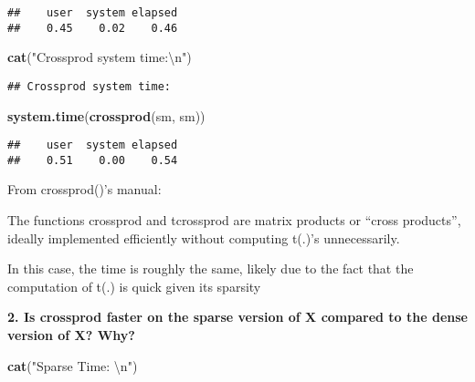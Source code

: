 \documentclass[]{article}
\newenvironment{Shaded}{\begin{snugshade}}{\end{snugshade}}
\newcommand{\CharTok}[1]{\textcolor[rgb]{0.31,0.60,0.02}{#1}}
\newcommand{\KeywordTok}[1]{\textcolor[rgb]{0.13,0.29,0.53}{\textbf{#1}}}
\newcommand{\NormalTok}[1]{#1}
\newcommand{\OperatorTok}[1]{\textcolor[rgb]{0.81,0.36,0.00}{\textbf{#1}}}
\newcommand{\StringTok}[1]{\textcolor[rgb]{0.31,0.60,0.02}{#1}}
\begin{document}
\begin{Shaded}
\end{Shaded}

\begin{verbatim}
##    user  system elapsed 
##    0.45    0.02    0.46
\end{verbatim}

\begin{Shaded}
\begin{Highlighting}[]
\KeywordTok{cat}\NormalTok{(}\StringTok{"Crossprod system time:}\CharTok{\textbackslash{}n}\StringTok{"}\NormalTok{)}
\end{Highlighting}
\end{Shaded}

\begin{verbatim}
## Crossprod system time:
\end{verbatim}

\begin{Shaded}
\begin{Highlighting}[]
\KeywordTok{system.time}\NormalTok{(}\KeywordTok{crossprod}\NormalTok{(sm, sm))}
\end{Highlighting}
\end{Shaded}

\begin{verbatim}
##    user  system elapsed 
##    0.51    0.00    0.54
\end{verbatim}

From crossprod()'s manual:

The functions crossprod and tcrossprod are matrix products or ``cross
products'', ideally implemented efficiently without computing t(.)'s
unnecessarily.

In this case, the time is roughly the same, likely due to the fact that
the computation of t(.) is quick given its sparsity

\textbf{2. Is crossprod faster on the sparse version of X compared to
the dense version of X? Why?}

\begin{Shaded}
\begin{Highlighting}[]
\KeywordTok{cat}\NormalTok{(}\StringTok{"Sparse Time: }\CharTok{\textbackslash{}n}\StringTok{"}\NormalTok{)}
\end{Highlighting}
\end{Shaded}
\end{document}
